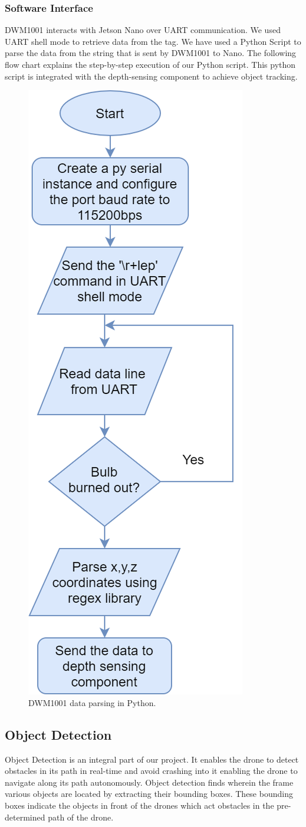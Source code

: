 \documentclass{IEEEtran}
\begin{document}
\subsubsection{Software Interface}
DWM1001 interacts with Jetson Nano over UART communication. We used UART shell mode to retrieve data from the tag. We have used a Python Script to parse the data from the string that is sent by DWM1001 to Nano. The following flow chart explains the step-by-step execution of our Python script. This python script is integrated with the depth-sensing component to achieve object tracking.

\begin{figure}[htb]
\centering
\includegraphics[width=0.42\linewidth]{fig/UWB_flow_diagram.png}
\caption{DWM1001 data parsing in Python.} \label{fig.structure}
\end{figure}

\subsection{Object Detection}

Object Detection is an integral part of our project. It enables the drone to detect obstacles in its path in real-time and avoid crashing into it enabling the drone to navigate along its path autonomously. Object detection finds wherein the frame various objects are located by extracting their bounding boxes. These bounding boxes indicate the objects in front of the drones which act obstacles in the pre-determined path of the drone.
\end{document}
